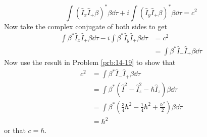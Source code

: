 \documentclass[../notes.tex]{subfiles}
\begin{document}
\begin{enumerate}[label={\textbf{14-\arabic*.}},ref={14-\arabic*}]
\begin{equation*}
        \int(\hat{I}_x\hat{I}_+\beta)^*\beta\dd{\tau}+i\int(\hat{I}_y\hat{I}_+\beta)^*\beta\dd{\tau} = c^2
    \end{equation*}
    Now take the complex conjugate of both sides to get
    \begin{align*}
        \int\beta^*\hat{I}_x\hat{I}_+\beta\dd{\tau}-i\int\beta^*\hat{I}_y\hat{I}_+\beta\dd{\tau} &= c^2\\
        &= \int\beta^*\hat{I}_-\hat{I}_+\beta\dd{\tau}
    \end{align*}
    Now use the result in Problem \ref{prb:14-19} to show that
    \begin{align*}
        c^2 &= \int\beta^*\hat{I}_-\hat{I}_+\beta\dd{\tau}\\
        &= \int\beta^*(\hat{I}^2-\hat{I}_z^2-\hbar\hat{I}_z)\beta\dd{\tau}\\
        &= \int\beta^*\left( \frac{3}{4}\hbar^2-\frac{1}{4}\hbar^2+\frac{\hbar^2}{2} \right)\beta\dd{\tau}\\
        &= \hbar^2
    \end{align*}
    or that $c=\hbar$.
\end{enumerate}
\end{document}
